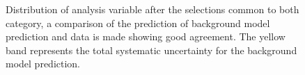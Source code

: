 \begin{figure}[p]
     \begin{center}

    \end{center}
    \caption{Distribution of analysis variable after the selections common to both category, a comparison of the prediction
	   of background model prediction and data is made showing good agreement.  The yellow band represents the total
		systematic uncertainty for the background model prediction.}
   \label{fig:selections}
\end{figure}




